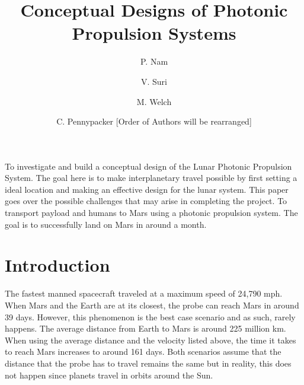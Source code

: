 \documentclass{aa}
\begin{document}
 


   \title{Conceptual Designs of Photonic Propulsion Systems}


   \author{P. Nam
          \and
          V. Suri
          \and
          M. Welch
          \and
          C. Pennypacker [Order of Authors will be rearranged]
          }


 
  \abstract
   {To investigate and build a conceptual design of the Lunar Photonic Propulsion System. The goal here is to make interplanetary travel possible by first setting a ideal location and making an effective design for the lunar system. This paper goes over the possible challenges that may arise in completing the project.}
   {To transport payload and humans to Mars using a photonic propulsion system. The goal is to successfully land on Mars in around a month.}

   {}


   \maketitle
%

\section{Introduction}

	The fastest manned spacecraft traveled at a maximum speed of 24,790 mph. When Mars and the Earth are at its closest, the probe can reach Mars in around 39 days. However, this phenomenon is the best case scenario and as such, rarely happens. The average distance from Earth to Mars is around 225 million km. When using the average distance and the velocity listed above, the time it takes to reach Mars increases to around 161 days. Both scenarios assume that the distance that the probe has to travel remains the same but in reality, this does not happen since planets travel in orbits around the Sun.
    
\end{document}
